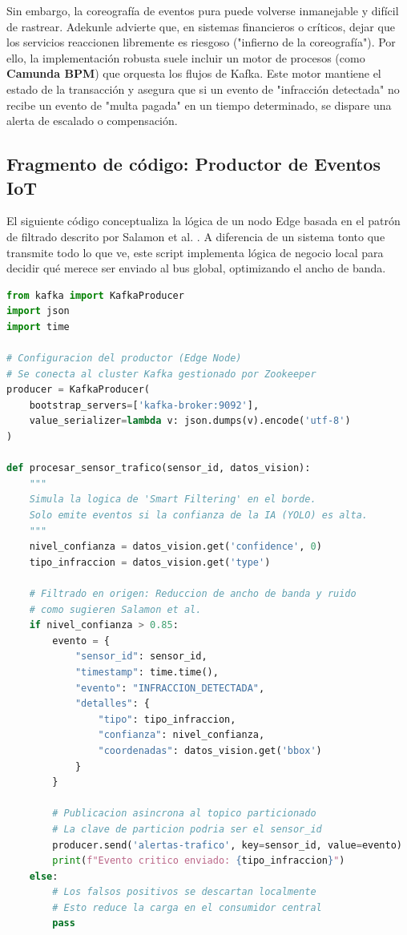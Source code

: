 Sin embargo, la coreografía de eventos pura puede volverse inmanejable y difícil de rastrear. Adekunle \cite{adekunle2024financial} advierte que, en sistemas financieros o críticos, dejar que los servicios reaccionen libremente es riesgoso ("infierno de la coreografía"). Por ello, la implementación robusta suele incluir un motor de procesos (como \textbf{Camunda BPM}) que orquesta los flujos de Kafka. Este motor mantiene el estado de la transacción y asegura que si un evento de "infracción detectada" no recibe un evento de "multa pagada" en un tiempo determinado, se dispare una alerta de escalado o compensación.

\subsection{Fragmento de código: Productor de Eventos IoT}
El siguiente código conceptualiza la lógica de un nodo Edge basada en el patrón de filtrado descrito por Salamon et al. \cite{salamon2018gateway}. A diferencia de un sistema tonto que transmite todo lo que ve, este script implementa lógica de negocio local para decidir qué merece ser enviado al bus global, optimizando el ancho de banda.

\begin{lstlisting}[language=Python]
from kafka import KafkaProducer
import json
import time

# Configuracion del productor (Edge Node)
# Se conecta al cluster Kafka gestionado por Zookeeper
producer = KafkaProducer(
    bootstrap_servers=['kafka-broker:9092'],
    value_serializer=lambda v: json.dumps(v).encode('utf-8')
)

def procesar_sensor_trafico(sensor_id, datos_vision):
    """
    Simula la logica de 'Smart Filtering' en el borde.
    Solo emite eventos si la confianza de la IA (YOLO) es alta.
    """
    nivel_confianza = datos_vision.get('confidence', 0)
    tipo_infraccion = datos_vision.get('type')

    # Filtrado en origen: Reduccion de ancho de banda y ruido
    # como sugieren Salamon et al.
    if nivel_confianza > 0.85:
        evento = {
            "sensor_id": sensor_id,
            "timestamp": time.time(),
            "evento": "INFRACCION_DETECTADA",
            "detalles": {
                "tipo": tipo_infraccion,
                "confianza": nivel_confianza,
                "coordenadas": datos_vision.get('bbox')
            }
        }
        
        # Publicacion asincrona al topico particionado
        # La clave de particion podria ser el sensor_id
        producer.send('alertas-trafico', key=sensor_id, value=evento)
        print(f"Evento critico enviado: {tipo_infraccion}")
    else:
        # Los falsos positivos se descartan localmente
        # Esto reduce la carga en el consumidor central
        pass
\end{lstlisting}